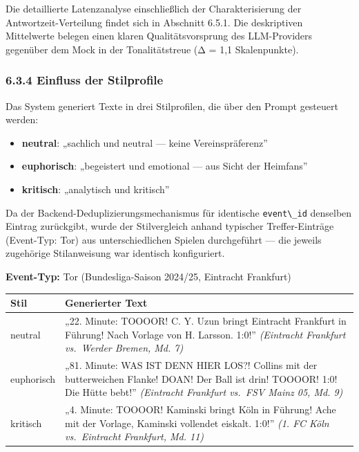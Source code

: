 Die detaillierte Latenzanalyse einschließlich der Charakterisierung der
Antwortzeit-Verteilung findet sich in Abschnitt 6.5.1. Die deskriptiven
Mittelwerte belegen einen klaren Qualitätsvorsprung des LLM-Providers
gegenüber dem Mock in der Tonalitätstreue (Δ = 1,1 Skalenpunkte).

\subsubsection{6.3.4 Einfluss der
Stilprofile}\label{einfluss-der-stilprofile}

Das System generiert Texte in drei Stilprofilen, die über den Prompt
gesteuert werden:

\begin{itemize}
\tightlist
\item
  \textbf{neutral}: „sachlich und neutral --- keine Vereinspräferenz''
\item
  \textbf{euphorisch}: „begeistert und emotional --- aus Sicht der
  Heimfans''
\item
  \textbf{kritisch}: „analytisch und kritisch''
\end{itemize}

Da der Backend-Deduplizierungsmechanismus für identische
\passthrough{\lstinline!event\_id!} denselben Eintrag zurückgibt, wurde
der Stilvergleich anhand typischer Treffer-Einträge (Event-Typ: Tor) aus
unterschiedlichen Spielen durchgeführt --- die jeweils zugehörige
Stilanweisung war identisch konfiguriert.

\textbf{Event-Typ:} Tor (Bundesliga-Saison 2024/25, Eintracht Frankfurt)

{\def\LTcaptype{none} %
\begin{longtable}[]{@{}
  >{\raggedright\arraybackslash}p{}
  >{\raggedright\arraybackslash}p{}@{}}
\toprule\noalign{}
\begin{minipage}[b]{\linewidth}\raggedright
Stil
\end{minipage} & \begin{minipage}[b]{\linewidth}\raggedright
Generierter Text
\end{minipage} \\
\midrule\noalign{}
\endhead
\bottomrule\noalign{}
\endlastfoot
neutral & „22. Minute: TOOOOR! C. Y. Uzun bringt Eintracht Frankfurt in
Führung! Nach Vorlage von H. Larsson. 1:0!'' \emph{(Eintracht Frankfurt
vs.~Werder Bremen, Md. 7)} \\
euphorisch & „81. Minute: WAS IST DENN HIER LOS?! Collins mit der
butterweichen Flanke! DOAN! Der Ball ist drin! TOOOOR! 1:0! Die Hütte
bebt!'' \emph{(Eintracht Frankfurt vs.~FSV Mainz 05, Md. 9)} \\
kritisch & „4. Minute: TOOOOR! Kaminski bringt Köln in Führung! Ache mit
der Vorlage, Kaminski vollendet eiskalt. 1:0!'' \emph{(1. FC Köln
vs.~Eintracht Frankfurt, Md. 11)} \\
\end{longtable}
}

